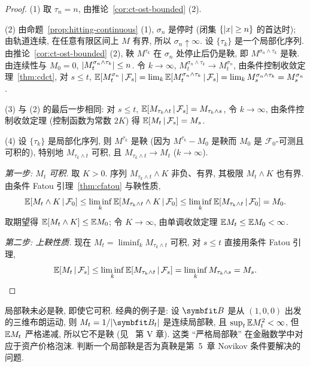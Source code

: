 \begin{proof}
(1) 取 $\tau_n=n$, 由推论~\ref{cor:ct-ost-bounded} (2).

(2) 由命题~\ref{prop:hitting-continuous} (1), $\sigma_n$ 是停时 (闭集 $\{\lvert x\rvert\ge n\}$ 的首达时); 由轨道连续, 在任意有限区间上 $M$ 有界, 所以 $\sigma_n\uparrow\infty$. 设 $\{\tau_k\}$ 是一个局部化序列. 由推论~\ref{cor:ct-ost-bounded} (2), 鞅 $M^{\tau_k}$ 在 $\sigma_n$ 处停止后仍是鞅, 即 $M^{\sigma_n\wedge\tau_k}$ 是鞅. 由连续性与 $M_0=0$, $\lvert M^{\sigma_n\wedge\tau_k}_t\rvert\le n$. 令 $k\to\infty$, $M^{\sigma_n\wedge\tau_k}_t\to M^{\sigma_n}_t$, 由条件控制收敛定理~\ref{thm:cdct}, 对 $s\le t$, $\mathbb{E}[M^{\sigma_n}_t\,|\,\mathcal{F}_s]=\lim_k\mathbb{E}[M^{\sigma_n\wedge\tau_k}_t\,|\,\mathcal{F}_s]=\lim_kM^{\sigma_n\wedge\tau_k}_s=M^{\sigma_n}_s$.

(3) 与 (2) 的最后一步相同: 对 $s\le t$, $\mathbb{E}[M_{\tau_k\wedge t}\,|\,\mathcal{F}_s]=M_{\tau_k\wedge s}$, 令 $k\to\infty$, 由条件控制收敛定理 (控制函数为常数 $2K$) 得 $\mathbb{E}[M_t\,|\,\mathcal{F}_s]=M_s$.

(4) 设 $\{\tau_k\}$ 是局部化序列, 则 $M^{\tau_k}$ 是鞅 (因为 $M^{\tau_k}-M_0$ 是鞅而 $M_0$ 是 $\mathcal{F}_0$-可测且可积的), 特别地 $M_{\tau_k\wedge t}$ 可积, 且 $M_{\tau_k\wedge t}\to M_t$ ($k\to\infty$).

\emph{第一步: $M_t$ 可积.} 取 $K>0$. 序列 $M_{\tau_k\wedge t}\wedge K$ 非负、有界, 其极限 $M_t\wedge K$ 也有界. 由条件 Fatou 引理~\ref{thm:cfatou} 与鞅性质,
\[
\mathbb{E}[M_t\wedge K\,|\,\mathcal{F}_0]\le\liminf_k\mathbb{E}[M_{\tau_k\wedge t}\wedge K\,|\,\mathcal{F}_0]\le\liminf_k\mathbb{E}[M_{\tau_k\wedge t}\,|\,\mathcal{F}_0]=M_0.
\]
取期望得 $\mathbb{E}[M_t\wedge K]\le\mathbb{E} M_0$; 令 $K\to\infty$, 由单调收敛定理 $\mathbb{E} M_t\le\mathbb{E} M_0<\infty$.

\emph{第二步: 上鞅性质.} 现在 $M_t=\liminf_kM_{\tau_k\wedge t}$ 可积, 对 $s\le t$ 直接用条件 Fatou 引理,
\[
\mathbb{E}[M_t\,|\,\mathcal{F}_s]\le\liminf_k\mathbb{E}[M_{\tau_k\wedge t}\,|\,\mathcal{F}_s]=\liminf_kM_{\tau_k\wedge s}=M_s.
\]
\end{proof}

\begin{remark}
局部鞅未必是鞅, 即使它可积. 经典的例子是: 设 $\rvec{B}$ 是从 $(1,0,0)$ 出发的三维布朗运动, 则 $M_t=1/\abs{\rvec{B}_t}$ 是连续局部鞅, 且 $\sup_t\mathbb{E} M_t^2<\infty$, 但 $\mathbb{E} M_t$ 严格递减, 所以它不是鞅 (见~\cite{revuz} 第 V 章). 这类 ``严格局部鞅'' 在金融数学中对应于资产价格泡沫. 判断一个局部鞅是否为真鞅是第~5~章 Novikov 条件要解决的问题.
\end{remark}


